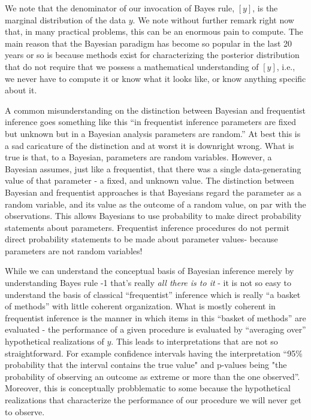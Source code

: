 We note that the denominator of our invocation of Bayes rule, $[y]$, is the marginal distribution of the data $y$.   We note without further remark right now that, in many practical problems, this can be an enormous pain to compute. The main reason that the Bayesian paradigm has become so popular in the last 20 years or so is because methods exist for characterizing the posterior distribution that do not require that we possess a mathematical understanding of $[y]$, i.e., we never have to compute it or know what it looks like, or know anything specific about it. 


A common misunderstanding on the distinction between Bayesian and frequentist inference goes something like this ``in frequentist inference parameters are fixed but unknown but in a Bayesian analysis parameters are random.'' At best this is a sad caricature of the distinction and at worst it is downright wrong. What is true is that, to a Bayesian, parameters are random variables. However, a Bayesian assumes, just like a frequentist, that there was a single data-generating value of that parameter - a fixed, and unknown value.  The distinction between Bayesian and frequentist approaches is that Bayesians regard the parameter as a random variable, and its value as the outcome of a random value, on par with the observations. This allows Bayesians to use probability to make direct probability statements about parameters. Frequentist inference procedures do not permit direct probability statements to be made about parameter values- because parameters are not random variables!

While we can understand the conceptual basis of Bayesian inference
merely by understanding Bayes rule -1 that's really {\it all there is
  to it} - it is not so easy to understand the basis of  classical
``frequentist'' inference which is really ``a basket of methods'' with
little coherent organization. What is mostly coherent in frequentist
inference is the manner in which items in this ``basket of methods''
are evaluated - the performance of a given procedure is evaluated by
``averaging over'' hypothetical realizations of $y$. This leads to
interpretations that are not so straightforward. For example
confidence intervals having the interpretation ``95\% probability that the interval contains the true value" and p-values being "the probability of observing an outcome as extreme or more than the one observed''. Moreover, this is conceptually probblematic to some because the hypothetical realizations that characterize the performance of our procedure we will never get to observe.  

